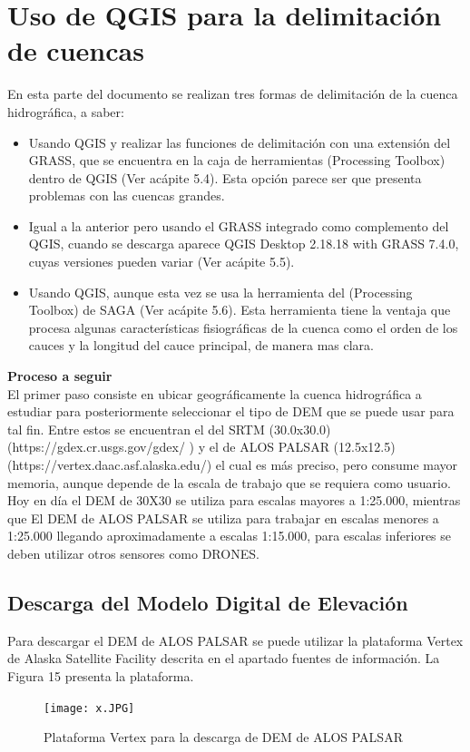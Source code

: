 \documentclass[12pt,hidelinks]{article}
\begin{document}
\section{Uso de QGIS para la delimitación de cuencas}
  En esta parte del documento se realizan tres formas de delimitación de la cuenca hidrográfica, a
saber:
\begin{itemize}
    
 \item Usando QGIS y realizar las funciones de delimitación con una extensión del GRASS, que se
encuentra en la caja de herramientas (Processing Toolbox) dentro de QGIS (Ver acápite
5.4). Esta opción parece ser que presenta problemas con las cuencas grandes.
 \item  Igual a la anterior pero usando el GRASS integrado como complemento del QGIS, cuando
se descarga aparece QGIS Desktop 2.18.18 with GRASS 7.4.0, cuyas versiones pueden
variar (Ver acápite 5.5).
 \item Usando QGIS, aunque esta vez se usa la herramienta del (Processing Toolbox) de SAGA
(Ver acápite 5.6). Esta herramienta tiene la ventaja que procesa algunas características
fisiográficas de la cuenca como el orden de los cauces y la longitud del cauce principal, de
manera mas clara.
\end{itemize}
\textbf{Proceso a seguir}\\
El primer paso consiste en ubicar geográficamente la cuenca hidrográfica a estudiar para posteriormente seleccionar el tipo de DEM que se puede usar para tal fin. Entre estos se encuentran el del SRTM (30.0x30.0) (https://gdex.cr.usgs.gov/gdex/ ) y el de ALOS PALSAR (12.5x12.5)
(https://vertex.daac.asf.alaska.edu/) el cual es más preciso, pero consume mayor memoria, aunque depende de la escala de trabajo que se requiera como usuario. Hoy en día el DEM de 30X30 se utiliza para escalas mayores a 1:25.000, mientras que El DEM de ALOS PALSAR se utiliza para trabajar en
escalas menores a 1:25.000 llegando aproximadamente a escalas 1:15.000, para escalas inferiores se deben utilizar otros sensores como DRONES.
\subsection{Descarga del Modelo Digital de Elevación}
Para descargar el DEM de ALOS PALSAR se puede utilizar la plataforma Vertex de Alaska
Satellite Facility descrita en el apartado fuentes de información. La Figura 15 presenta la plataforma.

\begin{figure}[H]
    \centering
    \texttt{[image: x.JPG]}
    \caption{Plataforma Vertex para la descarga de DEM de ALOS PALSAR}
    \label{fig:my_label}
\end{figure}
\end{document}
